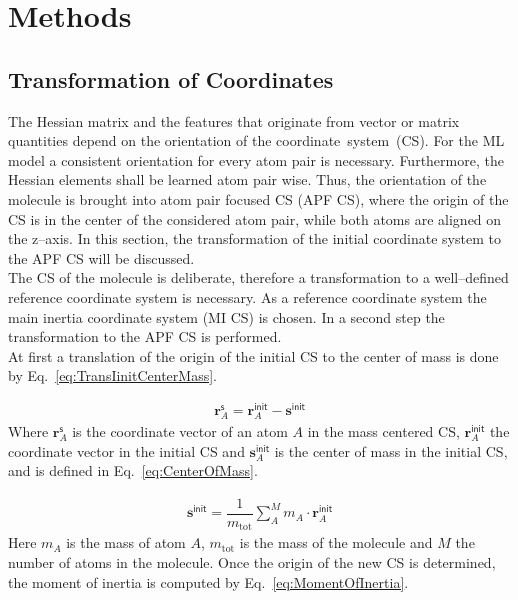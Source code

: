 \chapter{Methods}

	\section{Transformation of Coordinates}
	The Hessian matrix and the features that originate from vector or matrix quantities depend on the orientation of the coordinate~system~(CS).
	For the ML model a consistent orientation for every atom pair is necessary.
	Furthermore, the Hessian elements shall be learned atom pair wise.
	Thus, the orientation of the molecule is brought into atom pair focused CS (APF CS),
	where the origin of the CS is in the center of the considered atom pair,
	while both atoms are aligned on the z--axis.
	In this section,
	the transformation of the initial coordinate system to the APF CS will be discussed.\\
	The CS of the molecule is deliberate,
	therefore a transformation to a well--defined reference coordinate system is necessary.
	As a reference coordinate system the main inertia coordinate system (MI CS) is chosen.
	In a second step the transformation to the APF CS is performed.\\
	At first a translation of the origin of the initial CS to the center of mass is done by Eq.~\eqref{eq:TransIinitCenterMass}.
	
	\begin{align}
		\textbf{r}^\mathsf{s}_A =  \textbf{r}^\mathsf{init}_A - \textbf{s}^\mathsf{init}
		\label{eq:TransIinitCenterMass}
	\end{align}
	Where $\textbf{r}^\mathsf{s}_A$ is the coordinate vector of an atom $A$ in the mass centered CS, $\textbf{r}^\mathsf{init}_A$ the coordinate vector in the initial CS and $\textbf{s}^\mathsf{init}_A$ is the center of mass in the initial CS, and is defined in Eq.~\eqref{eq:CenterOfMass}.
	
	\begin{align}
		\textbf{s}^\mathsf{init} = \dfrac{1}{m_\mathrm{tot}} \sum_{A}^{M} m_A \cdot \textbf{r}^\mathsf{init}_A
		\label{eq:CenterOfMass}
	\end{align}
	Here $m_A$ is the mass of atom $A$, $m_\mathrm{tot}$ is the mass of the molecule and $M$ the number of atoms in the molecule.
	\newpage
	Once the origin of the new CS is determined,
	the moment of inertia is computed by Eq.~\eqref{eq:MomentOfInertia}.
	

